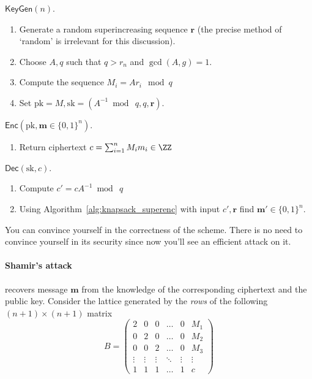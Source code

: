 \documentclass[11pt]{exam}
\theoremstyle{definition}
\let\vec\mathbf
\begin{document}
\medskip

$\mathsf{KeyGen}(n)$.
\begin{enumerate}
	\item Generate a random superincreasing sequence $\vec r$ (the precise method of `random' is irrelevant for this discussion).
	\item Choose $A, q$ such that $q>r_n$ and $\gcd(A,g) = 1$.
	\item Compute the sequence $M_i = Ar_i~\bmod q$
	\item Set $\mathrm{pk} = M, \mathrm{sk} = (A^{-1}\bmod~q, q, \vec r)$.
\end{enumerate}

\medskip

$\mathsf{Enc}(\mathrm{pk}, \vec m \in \{ 0,1\}^n)$.
\begin{enumerate}
	\item Return ciphertext $c = \sum_{i=1}^n M_i m_i \in \ZZ$
\end{enumerate}

\medskip
$\mathsf{Dec}(\mathrm{sk}, c)$.
\begin{enumerate}
	\item Compute $c' = c A^{-1}\bmod~q$
	\item Using Algorithm~\ref{alg:knapsack_superenc} with input $c', \vec r$ find $\vec m' \in \{0,1\}^n$.
\end{enumerate}

You can convince yourself in the correctness of the scheme. There is no need to convince yourself in its security since now you'll see an efficient attack on it.

\medskip

\paragraph{Shamir's attack} recovers message $\vec m$ from the knowledge of the corresponding ciphertext and the public key. Consider the lattice generated by the \emph{rows} of the following $(n+1) \times (n+1)$ matrix
\[
	B = 
	\begin{pmatrix}
		2 & 0 & 0 & \ldots & 0 & M_1 \\
		0 & 2 & 0 & \ldots & 0 & M_2 \\
		0 & 0 & 2 & \ldots & 0 & M_3 \\
		\vdots & \vdots & \vdots & \ddots & \vdots & \vdots \\
		1 & 1 & 1 & \ldots & 1 & c 
	\end{pmatrix}
\]
\end{document}
